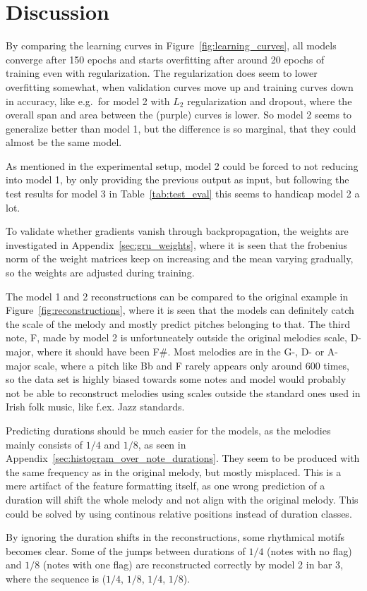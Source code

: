 \section{Discussion}
\label{sec:discussion}
By comparing the learning curves in Figure~\ref{fig:learning_curves}, all models converge after 150 epochs and starts overfitting after around 20 epochs of training even with regularization. The regularization does seem to lower overfitting somewhat, when validation curves move up and training curves down in accuracy, like e.g.\ for model 2 with $L_2$ regularization and dropout, where the overall span and area between the (purple) curves is lower. So model 2 seems to generalize better than model 1, but the difference is so marginal, that they could almost be the same model.

As mentioned in the experimental setup, model 2 could be forced to not reducing into model 1, by only providing the previous output as input, but following the test results for model 3 in Table~\ref{tab:test_eval} this seems to handicap model 2 a lot.  

To validate whether gradients vanish through backpropagation, the weights are investigated in Appendix~\ref{sec:gru_weights}, where it is seen that the frobenius norm of the weight matrices keep on increasing and the mean varying gradually, so the weights are adjusted during training. 

The model 1 and 2 reconstructions can be compared to the original example in Figure~\ref{fig:reconstructions}, where it is seen that the models can definitely catch the scale of the melody and mostly predict pitches belonging to that. The third note, F, made by model 2 is unfortuneately outside the original melodies scale, D-major, where it should have been F\#. Most melodies are in the G-, D- or A-major scale, where a pitch like Bb and F rarely appears only around 600 times, so the data set is highly biased towards some notes and model would probably not be able to reconstruct melodies using scales outside the standard ones used in Irish folk music, like f.ex. Jazz standards.   

Predicting durations should be much easier for the models, as the melodies mainly consists of $1/4$ and $1/8$, as seen in Appendix~\ref{sec:histogram_over_note_durations}. They seem to be produced with the same frequency as in the original melody, but mostly misplaced. This is a mere artifact of the feature formatting itself, as one wrong prediction of a duration will shift the whole melody and not align with the original melody. This could be solved by using continous relative positions instead of duration classes. 

By ignoring the duration shifts in the reconstructions, some rhythmical motifs becomes clear. Some of the jumps between durations of $1/4$ (notes with no flag) and $1/8$ (notes with one flag) are reconstructed correctly by model 2 in bar 3, where the sequence is ($1/4$, $1/8$, $1/4$, $1/8$). 
